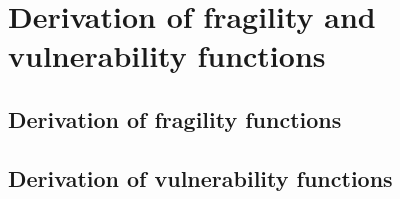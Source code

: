 	\section{Derivation of fragility and vulnerability functions}
	\label{sec:derive_fragility}
	
			
		\subsection{Derivation of fragility functions}
		\label{subsec:derive_fragility}
		
		
		\subsection{Derivation of vulnerability functions}
		\label{subsec:derive_vulnerability}
		
